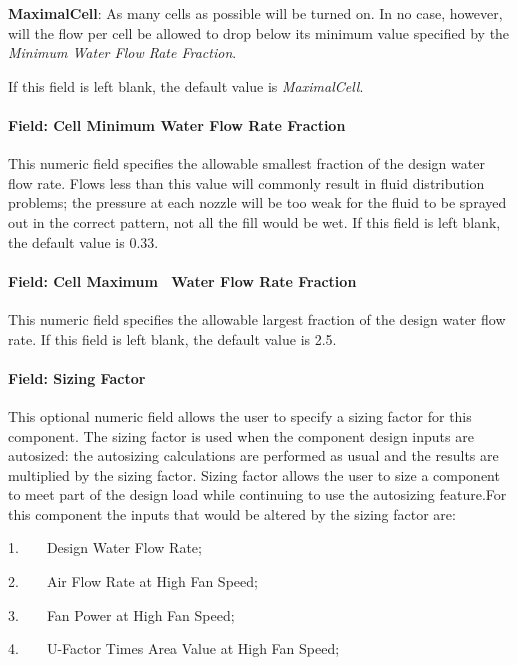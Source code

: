 \textbf{MaximalCell}: As many cells as possible will be turned on. In no case, however, will the flow per cell be allowed to drop below its minimum value specified by the \emph{Minimum Water Flow Rate Fraction}.

If this field is left blank, the default value is \textit{MaximalCell}.

\paragraph{Field: Cell Minimum Water Flow Rate Fraction}\label{field-cell-minimum-water-flow-rate-fraction-1}

This numeric field specifies the allowable smallest fraction of the design water flow rate. Flows less than this value will commonly result in fluid distribution problems; the pressure at each nozzle will be too weak for the fluid to be sprayed out in the correct pattern, not all the fill would be wet. If this field is left blank, the default value is 0.33.

\paragraph{Field: Cell Maximum~ Water Flow Rate Fraction}\label{field-cell-maximum-water-flow-rate-fraction-1}

This numeric field specifies the allowable largest fraction of the design water flow rate. If this field is left blank, the default value is 2.5.

\paragraph{Field: Sizing Factor}\label{field-sizing-factor}

This optional numeric field allows the user to specify a sizing factor for this component. The sizing factor is used when the component design inputs are autosized: the autosizing calculations are performed as usual and the results are multiplied by the sizing factor. Sizing factor allows the user to size a component to meet part of the design load while continuing to use the autosizing feature.For this component the inputs that would be altered by the sizing factor are:

1.~~~~Design Water Flow Rate;

2.~~~~Air Flow Rate at High Fan Speed;

3.~~~~Fan Power at High Fan Speed;

4.~~~~U-Factor Times Area Value at High Fan Speed;

